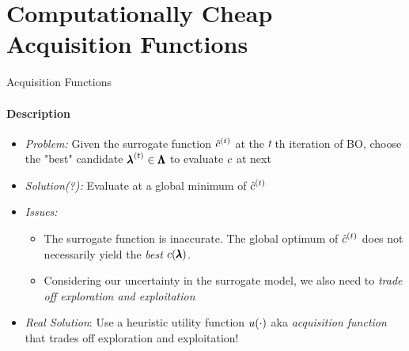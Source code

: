 \section{Computationally Cheap Acquisition Functions}
\begin{frame}[c]{Acquisition Functions}
\framesubtitle{Description}
\begin{itemize}
    \item \emph{Problem:} Given the surrogate function ${\hat{c}}^{(t)}$ at the $t\,$th iteration of BO, choose the "best" candidate ${\pmb{\lambda}}^{(t)}\in \pmb{\Lambda}$ to evaluate $c$ at next
    \pause
    \smallskip
    \item \emph{Solution(?):} Evaluate at a global minimum of ${\hat{c}}^{(t)}$ 
    \item \emph{Issues:}
    \begin{itemize}
        \item The surrogate function is inaccurate. The global optimum of ${\hat{c}}^{(t)}$ does not necessarily yield the \emph{best} $c(\pmb{\lambda})$. 
        \item Considering our uncertainty in the surrogate model, we also need to \emph{trade off exploration and exploitation}
    \end{itemize}
    \pause
    \item \emph{Real Solution}: Use a heuristic utility function $u(\cdot)$ aka \emph{acquisition function} that trades off exploration and exploitation!
\end{itemize}

\end{frame}
